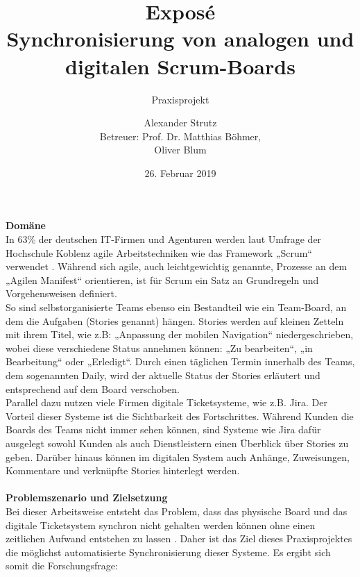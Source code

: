 \documentclass[12pt,titlepage]{scrartcl}
\begin{document}
	\begin{titlepage}
		\title{Exposé \\ \glqq Synchronisierung von analogen und digitalen Scrum-Boards\grqq{}} 
		\subtitle{Praxisprojekt}
		\author{Alexander Strutz \vspace{0.5cm}\\ Betreuer: 
		Prof. Dr. Matthias Böhmer,\\Oliver Blum}
 		\date{26. Februar 2019}
		\maketitle
	\end{titlepage}
	\newpage
	\noindent \textbf{Domäne} \\
	In 63\% der deutschen IT-Firmen und Agenturen werden laut Umfrage der Hochschule Koblenz agile Arbeitstechniken wie das Framework „Scrum“ verwendet \cite{hskob}. Während sich agile, auch leichtgewichtig genannte, Prozesse an dem „Agilen Manifest“ orientieren, ist für Scrum ein Satz an Grundregeln und Vorgehensweisen definiert. \\
So sind selbstorganisierte Teams ebenso ein Bestandteil wie ein Team-Board, an dem die Aufgaben (Stories genannt) hängen. Stories werden auf kleinen Zetteln mit ihrem Titel, wie z.B: „Anpassung der mobilen Navigation“ niedergeschrieben, wobei diese verschiedene Status annehmen können: „Zu bearbeiten“, „in Bearbeitung“ oder „Erledigt“. Durch einen täglichen Termin innerhalb des Teams, dem sogenannten Daily, wird der aktuelle Status der Stories erläutert und entsprechend auf dem Board verschoben. \\
Parallel dazu nutzen viele Firmen digitale Ticketsysteme, wie z.B. Jira. Der Vorteil dieser Systeme ist die Sichtbarkeit des Fortschrittes. Während Kunden die Boards des Teams nicht immer sehen können, sind Systeme wie Jira dafür ausgelegt sowohl Kunden als auch Dienstleistern einen Überblick über Stories zu geben. Darüber hinaus können im digitalen System auch Anhänge, Zuweisungen, Kommentare und verknüpfte Stories hinterlegt werden. \\ \\
\textbf{Problemszenario und Zielsetzung} \\
Bei dieser Arbeitsweise entsteht das Problem, dass das physische Board und das digitale Ticketsystem synchron  nicht gehalten werden können ohne einen zeitlichen Aufwand entstehen zu lassen \cite{sync}. Daher ist das Ziel dieses Praxisprojektes die möglichst automatisierte Synchronisierung dieser Systeme. Es ergibt sich somit die Forschungsfrage: \\
\end{document}
